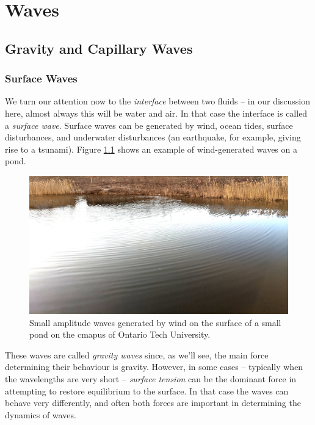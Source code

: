 \chapter{Waves}

%
%

\section{Gravity and Capillary Waves}



\subsection{Surface Waves}

We turn our attention now to the \emph{interface} between two fluids -- in our discussion here, almost always this will be water and air.  In that case the interface is called a \emph{surface wave}.  Surface waves can be generated by wind, ocean tides, surface disturbances, and underwater disturbances (an earthquake, for example, giving rise to a tsunami).  Figure \ref{fig_pond} shows an example of wind-generated waves on a pond.  

\begin{figure}
\centering\includegraphics[width=0.9\linewidth]{Figures/Chapter5/fig_pond_waves}
\caption{Small amplitude waves generated by wind on the surface of a small pond on the cmapus of Ontario Tech University.}
\label{fig_pond}
\end{figure}

These waves are called \emph{gravity waves} since, as we'll see, the main force determining their behaviour is gravity.  However, in some cases -- typically when the wavelengths are very short -- \emph{surface tension} can be the dominant force in attempting to restore equilibrium to the surface.  In that case the waves can behave very differently, and often both forces are important in determining the dynamics of waves.

